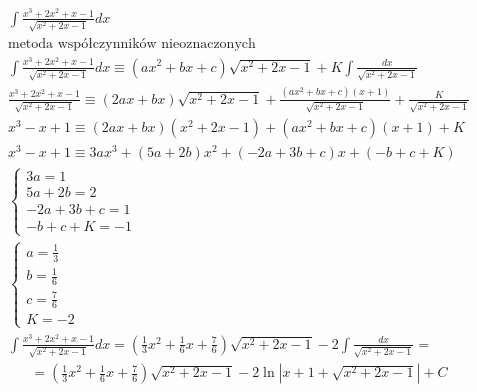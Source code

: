 \begin{gather*}
  \int \frac{x^3+2x^2+x-1}{\sqrt{x^2+2x-1}}dx \\
  \text{metoda współczynników nieoznaczonych} \\
  \int \frac{x^3+2x^2+x-1}{\sqrt{x^2+2x-1}}dx \equiv (ax^2+bx+c)\sqrt{x^2+2x-1}+K\int \frac{dx}{\sqrt{x^2+2x-1}} \\
\frac{x^3+2x^2+x-1}{\sqrt{x^2+2x-1}} \equiv (2ax+bx)\sqrt{x^2+2x-1}+\frac{(ax^2+bx+c)(x+1)}{\sqrt{x^2+2x-1}}+ \frac{K}{\sqrt{x^2+2x-1}} \\
x^3-x+1 \equiv (2ax+bx)(x^2+2x-1)+(ax^2+bx+c)(x+1)+K \\
x^3-x+1 \equiv 3ax^3+(5a+2b)x^2+(-2a+3b+c)x+(-b+c+K) \\
\begin{cases} 3a=1 \\ 5a+2b=2 \\ -2a+3b+c=1 \\ -b+c+K=-1 \end{cases} \\
\begin{cases} a=\frac{1}{3} \\ b=\frac{1}{6} \\ c=\frac{7}{6} \\ K=-2 \end{cases} \\
\int \frac{x^3+2x^2+x-1}{\sqrt{x^2+2x-1}}dx = (\frac{1}{3}x^2+\frac{1}{6}x+\frac{7}{6})\sqrt{x^2+2x-1}-2\int \frac{dx}{\sqrt{x^2+2x-1}} = \end{gather*}
\begin{gather*}= (\frac{1}{3}x^2+\frac{1}{6}x+\frac{7}{6})\sqrt{x^2+2x-1}- 2\ln|x+1+\sqrt{x^2+2x-1}|+C\end{gather*}

